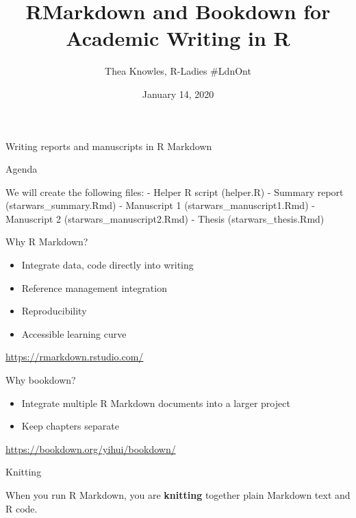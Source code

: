 \documentclass[
  ignorenonframetext,
]{beamer}
\title{RMarkdown and Bookdown for Academic Writing in R}
\author{Thea Knowles, R-Ladies \#LdnOnt}
\date{January 14, 2020}
\providecommand{\tightlist}{%
  \setlength{\itemsep}{0pt}\setlength{\parskip}{0pt}}
\begin{document}
\frame{\titlepage}

\begin{frame}{Writing reports and manuscripts in R Markdown}
\protect\hypertarget{writing-reports-and-manuscripts-in-r-markdown}{}

\begin{block}{Agenda}

We will create the following files: - Helper R script (helper.R) -
Summary report (starwars\_summary.Rmd) - Manuscript 1
(starwars\_manuscript1.Rmd) - Manuscript 2 (starwars\_manuscript2.Rmd) -
Thesis (starwars\_thesis.Rmd)

\end{block}

\begin{block}{Why R Markdown?}

\begin{itemize}
\tightlist
\item
  Integrate data, code directly into writing
\item
  Reference management integration
\item
  Reproducibility
\item
  Accessible learning curve
\end{itemize}

\url{https://rmarkdown.rstudio.com/}

\end{block}

\begin{block}{Why bookdown?}

\begin{itemize}
\tightlist
\item
  Integrate multiple R Markdown documents into a larger project
\item
  Keep chapters separate
\end{itemize}

\url{https://bookdown.org/yihui/bookdown/}

\end{block}

\begin{block}{Knitting}

When you run R Markdown, you are \textbf{knitting} together plain
Markdown text and R code.

\end{block}

\end{frame}
\end{document}
